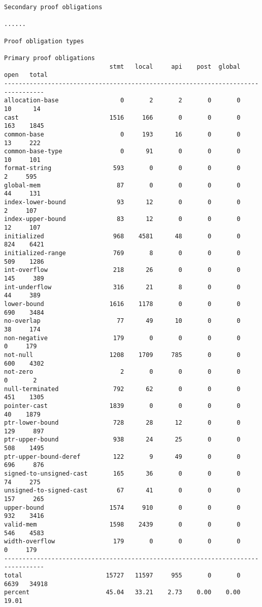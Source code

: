 \documentclass[11pt]{article}
\begin{document}
\begin{scriptsize}
\begin{verbatim}
Secondary proof obligations

......

Proof obligation types

Primary proof obligations
                             stmt   local     api    post  global    open   total
---------------------------------------------------------------------------------
allocation-base                 0       2       2       0       0      10      14
cast                         1516     166       0       0       0     163    1845
common-base                     0     193      16       0       0      13     222
common-base-type                0      91       0       0       0      10     101
format-string                 593       0       0       0       0       2     595
global-mem                     87       0       0       0       0      44     131
index-lower-bound              93      12       0       0       0       2     107
index-upper-bound              83      12       0       0       0      12     107
initialized                   968    4581      48       0       0     824    6421
initialized-range             769       8       0       0       0     509    1286
int-overflow                  218      26       0       0       0     145     389
int-underflow                 316      21       8       0       0      44     389
lower-bound                  1616    1178       0       0       0     690    3484
no-overlap                     77      49      10       0       0      38     174
non-negative                  179       0       0       0       0       0     179
not-null                     1208    1709     785       0       0     600    4302
not-zero                        2       0       0       0       0       0       2
null-terminated               792      62       0       0       0     451    1305
pointer-cast                 1839       0       0       0       0      40    1879
ptr-lower-bound               728      28      12       0       0     129     897
ptr-upper-bound               938      24      25       0       0     508    1495
ptr-upper-bound-deref         122       9      49       0       0     696     876
signed-to-unsigned-cast       165      36       0       0       0      74     275
unsigned-to-signed-cast        67      41       0       0       0     157     265
upper-bound                  1574     910       0       0       0     932    3416
valid-mem                    1598    2439       0       0       0     546    4583
width-overflow                179       0       0       0       0       0     179
---------------------------------------------------------------------------------
total                       15727   11597     955       0       0    6639   34918
percent                     45.04   33.21    2.73    0.00    0.00   19.01


\end{verbatim}
\end{scriptsize}
\end{document}
